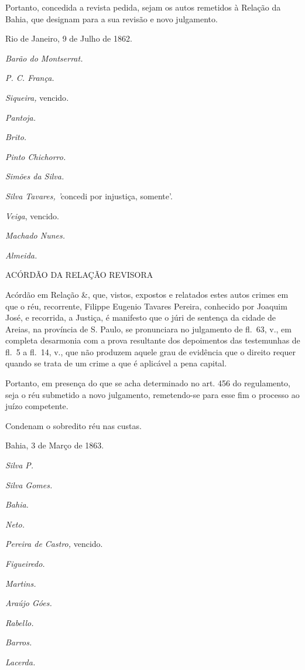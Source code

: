 Portanto, concedida a revista pedida, sejam os autos remetidos à Relação
da Bahia, que designam para a sua revisão e novo julgamento.

Rio de Janeiro, 9 de Julho de 1862.

\emph{Barão do Montserrat.}

\emph{P. C. França.}

\emph{Siqueira,} vencido\emph{.}

\emph{Pantoja.}

\emph{Brito.}

\emph{Pinto Chichorro.}

\emph{Simões da Silva.}

\emph{Silva Tavares, '}concedi por injustiça, somente'.

\emph{Veiga}, vencido.

\emph{Machado Nunes.}

\emph{Almeida.}

ACÓRDÃO DA RELAÇÃO REVISORA

Acórdão em Relação \&, que, vistos, expostos e relatados estes autos
crimes em que o réu, recorrente, Filippe Eugenio Tavares Pereira,
conhecido por Joaquim José, e recorrida, a Justiça, é manifesto que o
júri de sentença da cidade de Areias, na província de S. Paulo, se
pronunciara no julgamento de fl.~63, v., em completa desarmonia com a
prova resultante dos depoimentos das testemunhas de fl.~5 a fl.~14, v.,
que não produzem aquele grau de evidência que o direito requer quando se
trata de um crime a que é aplicável a pena capital.

Portanto, em presença do que se acha determinado no art. 456 do
regulamento, seja o réu submetido a novo julgamento, remetendo-se para
esse fim o processo ao juízo competente.

Condenam o sobredito réu nas custas.

Bahia, 3 de Março de 1863.

\emph{Silva P.}

\emph{Silva Gomes.}

\emph{Bahia.}

\emph{Neto.}

\emph{Pereira de Castro,} vencido.

\emph{Figueiredo.}

\emph{Martins.}

\emph{Araújo Góes.}

\emph{Rabello.}

\emph{Barros.}

\emph{Lacerda.}

